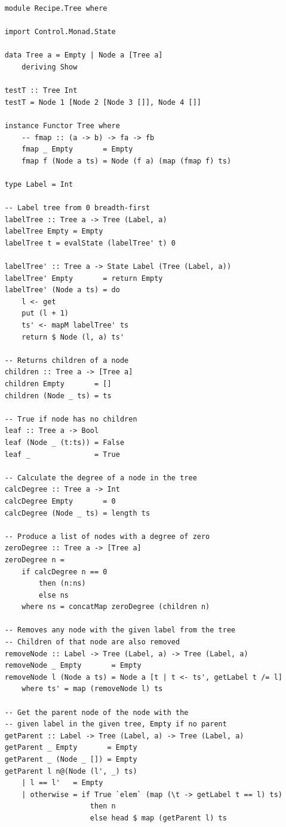 \documentclass[11pt]{article}
\begin{document}
    \begin{tt}
    \small
    \begin{lstlisting}
    module Recipe.Tree where
    
    import Control.Monad.State
    
    data Tree a = Empty | Node a [Tree a]
        deriving Show
    
    testT :: Tree Int
    testT = Node 1 [Node 2 [Node 3 []], Node 4 []]
    
    instance Functor Tree where
        -- fmap :: (a -> b) -> fa -> fb
        fmap _ Empty       = Empty
        fmap f (Node a ts) = Node (f a) (map (fmap f) ts)
    
    type Label = Int
    
    -- Label tree from 0 breadth-first 
    labelTree :: Tree a -> Tree (Label, a)
    labelTree Empty = Empty
    labelTree t = evalState (labelTree' t) 0
    
    labelTree' :: Tree a -> State Label (Tree (Label, a))
    labelTree' Empty       = return Empty
    labelTree' (Node a ts) = do
        l <- get
        put (l + 1)
        ts' <- mapM labelTree' ts
        return $ Node (l, a) ts'
        
    -- Returns children of a node
    children :: Tree a -> [Tree a]
    children Empty       = []
    children (Node _ ts) = ts
    
    -- True if node has no children
    leaf :: Tree a -> Bool
    leaf (Node _ (t:ts)) = False
    leaf _               = True
    
    -- Calculate the degree of a node in the tree
    calcDegree :: Tree a -> Int
    calcDegree Empty       = 0
    calcDegree (Node _ ts) = length ts
    
    -- Produce a list of nodes with a degree of zero
    zeroDegree :: Tree a -> [Tree a]
    zeroDegree n =
        if calcDegree n == 0
            then (n:ns)
            else ns
        where ns = concatMap zeroDegree (children n)
        
    -- Removes any node with the given label from the tree
    -- Children of that node are also removed
    removeNode :: Label -> Tree (Label, a) -> Tree (Label, a)
    removeNode _ Empty       = Empty
    removeNode l (Node a ts) = Node a [t | t <- ts', getLabel t /= l]
        where ts' = map (removeNode l) ts
    
    -- Get the parent node of the node with the
    -- given label in the given tree, Empty if no parent
    getParent :: Label -> Tree (Label, a) -> Tree (Label, a)
    getParent _ Empty       = Empty
    getParent _ (Node _ []) = Empty
    getParent l n@(Node (l', _) ts)
        | l == l'   = Empty
        | otherwise = if True `elem` (map (\t -> getLabel t == l) ts)
                        then n
                        else head $ map (getParent l) ts
    

\end{lstlisting}
\end{tt}
\end{document}
